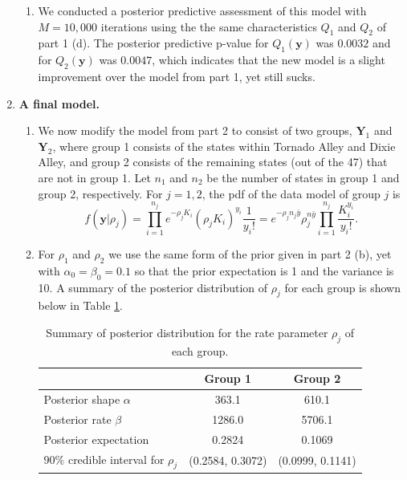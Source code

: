 \documentclass[12pt]{article}
\begin{document}
\begin{enumerate}
\begin{enumerate}
      \item We conducted a posterior predictive assessment of this model with $M = 10,000$ iterations 
        using the the same characteristics $Q_1$ and $Q_2$ of part 1 (d). The posterior predictive p-value for
        $Q_1(\bm{y})$ was $0.0032$ and for $Q_2(\bm{y})$ was $0.0047$, which indicates that the new model is a slight improvement over the model from
        part 1, yet still sucks.

    \end{enumerate}

  \item \textbf{A final model.}

    \begin{enumerate}
      \item We now modify the model from part 2 to consist of two groups, $\bm{Y}_1$ and $\bm{Y}_2$, where group 1 consists of the states
        within Tornado Alley and Dixie Alley, and group 2 consists of the remaining states (out of the 47) that are not in group 1.
        Let $n_1$ and $n_2$ be the number of states in group 1 and group 2, respectively. For $j = 1,2$, the pdf of the data model of group $j$ is 
        \[
          f(\bm{y}|\rho_j) = \prod_{i=1}^{n_j} e^{-\rho_j K_i}(\rho_j K_i)^{y_i} \frac{1}{y_i!} = e^{-\rho_j n_j\bar{y}}\rho_j^{n\bar{y}}
          \prod_{i=1}^{n_j}\frac{K_i^{y_i}}{y_i!}.
        \]

      \item For $\rho_1$ and $\rho_2$ we use the same form of the prior given in part 2 (b), yet with $\alpha_0 = \beta_0 = 0.1$ so that the prior
        expectation is 1 and the variance is 10. A summary of the posterior distribution of $\rho_j$ for each group is shown below in Table
        \ref{tab:3}.

        \begin{table}[h!]
          \centering
          \begin{tabular}{lcc}
            & Group 1 & Group 2 \\
            \hline
            Posterior shape $\alpha$ & 363.1 & 610.1 \\
            \hline
            Posterior rate $\beta$ & 1286.0 & 5706.1  \\
            \hline
            Posterior expectation & 0.2824 & 0.1069 \\
            \hline
            90\% credible interval for $\rho_j$ & (0.2584, 0.3072) & (0.0999, 0.1141) \\
            \hline
          \end{tabular}
          \caption{Summary of posterior distribution for the rate parameter $\rho_j$ of each group.}
          \label{tab:3}
        \end{table}


\end{enumerate}
\end{enumerate}
\end{document}

